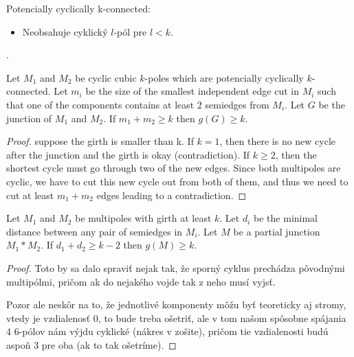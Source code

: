 \documentclass[12pt, twoside]{book}
\begin{document}
Potencially cyclically k-connected:
\begin{itemize}
	\item Neobsahuje cyklický $l$-pól pre $l<k$.
\end{itemize}

.

\begin{lemma}\label{le:junction-two-no-small-girth}
	Let $M_1$ and $M_2$ be cyclic cubic $k$-poles which are potencially cyclically $k$-connected. Let $m_i$ be the size of the smallest independent edge cut in $M_i$ such that one of the components contains at least 2 semiedges from $M_i$. Let $G$ be the junction of $M_1$ and $M_2$. If $m_1+m_2\geq k$ then $g(G)\geq k$.
\end{lemma}


\begin{proof}
	\todo{} suppose the girth is smaller than k. If $k=1$, then there is no new cycle after the junction and the girth is okay (contradiction). If $k\geq 2$, then the shortest cycle must go through two of the new edges. Since both multipoles are cyclic, we have to cut this new cycle out from both of them, and thus we need to cut at least $m_1+m_2$ edges leading to a contradiction. 
\end{proof}


\begin{lemma}\label{lem:cyclic-multipoles-with-girth-and-distance}
	Let $M_1$ and $M_2$ be multipoles with girth at least $k$. Let $d_i$ be the minimal distance between any pair of semiedges in $M_i$. Let $M$ be a partial junction $M_1*M_2$. If $d_1+d_2\geq k-2$ then $g(M)\geq k$.
\end{lemma}

\begin{proof}
	\todo{}Toto by sa dalo spraviť nejak tak, že sporný cyklus prechádza pôvodnými multipólmi, pričom ak do nejakého vojde tak z neho musí vyjsť.
	
	Pozor ale neskôr na to, že jednotlivé komponenty môžu byť teoreticky aj stromy, vtedy je vzdialenosť 0, to bude treba ošetriť, ale v tom našom spôsobne spájania 4 6-pólov nám výjdu cyklické (nákres v zošite), pričom tie vzdialenosti budú aspoň 3 pre oba (ak to tak ošetríme).
\end{proof}
\end{document}
